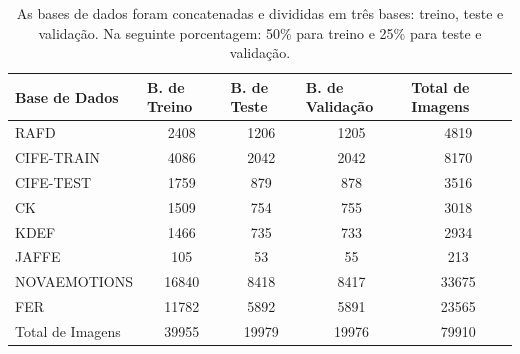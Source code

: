 \begin{table}[]
\centering
\caption{As bases de dados foram concatenadas e divididas em três bases: treino, teste e validação. Na seguinte porcentagem: 50\% para treino e 25\% para teste e validação. }
\label{table:basesdivisao}
\begin{tabular}{lcccc}
\hline
\textbf{Base de Dados} & \multicolumn{1}{l}{\textbf{B. de Treino}} & \multicolumn{1}{l}{\textbf{B. de Teste}} & \multicolumn{1}{l}{\textbf{B. de Validação}} & \multicolumn{1}{l}{\textbf{Total de Imagens}} \\ \hline
RAFD                   & 2408                                        & 1206                                       & 1205                                           & 4819                                          \\
CIFE-TRAIN             & 4086                                        & 2042                                       & 2042                                           & 8170                                          \\
CIFE-TEST              & 1759                                        & 879                                        & 878                                            & 3516                                          \\
CK                     & 1509                                        & 754                                        & 755                                            & 3018                                          \\
KDEF                   & 1466                                        & 735                                        & 733                                            & 2934                                          \\
JAFFE                  & 105                                         & 53                                         & 55                                             & 213                                           \\
NOVAEMOTIONS           & 16840                                       & 8418                                       & 8417                                           & 33675                                         \\
FER                    & 11782                                       & 5892                                       & 5891                                           & 23565                                         \\
Total de Imagens       & 39955                                       & 19979                                      & 19976                                          & 79910                                         \\ \hline
\end{tabular}
\end{table}



